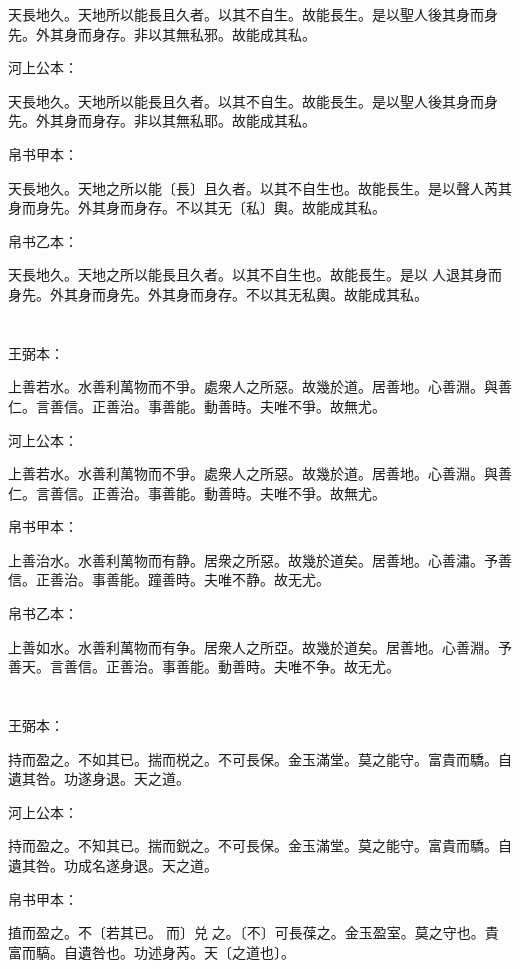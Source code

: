 \documentclass[a5paper]{ctexbook}
\begin{document}
    天長地久。天地所以能長且久者。以其不自生。故能長生。是以聖人後其身而身先。外其身而身存。非以其無私邪。故能成其私。

    河上公本：

    天長地久。天地所以能長且久者。以其不自生。故能長生。是以聖人後其身而身先。外其身而身存。非以其無私耶。故能成其私。

    帛书甲本：

    天長地久。天地之所以能〔長〕且久者。以其不自生也。故能長生。是以聲人芮其身而身先。外其身而身存。不以其无〔私〕輿。故能成其私。

    帛书乙本：

    天長地久。天地之所以能長且久者。以其不自生也。故能長生。是以𦔻人退其身而身先。外其身而身先。外其身而身存。不以其无私輿。故能成其私。

    \chapter{}
    王弼本：

    上善若水。水善利萬物而不爭。處衆人之所惡。故幾於道。居善地。心善淵。與善仁。言善信。正善治。事善能。動善時。夫唯不爭。故無尤。

    河上公本：

    上善若水。水善利萬物而不爭。處衆人之所惡。故幾於道。居善地。心善淵。與善仁。言善信。正善治。事善能。動善時。夫唯不爭。故無尤。

    帛书甲本：

    上善治水。水善利萬物而有静。居衆之所惡。故幾於道矣。居善地。心善潚。予善信。正善治。事善能。蹱善時。夫唯不静。故无尤。

    帛书乙本：

    上善如水。水善利萬物而有争。居衆人之所亞。故幾於道矣。居善地。心善淵。予善天。言善信。正善治。事善能。動善時。夫唯不争。故无尤。

    \chapter{}
    王弼本：

    持而盈之。不如其已。揣而棁之。不可長保。金玉滿堂。莫之能守。富貴而驕。自遺其咎。功遂身退。天之道。

    河上公本：

    持而盈之。不知其已。揣而鋭之。不可長保。金玉滿堂。莫之能守。富貴而驕。自遺其咎。功成名遂身退。天之道。

    帛书甲本：

    㨁而盈之。不〔若其已。𢵦而〕兑☐之。〔不〕可長葆之。金玉盈室。莫之守也。貴富而䮦。自遺咎也。功述身芮。天〔之道也〕。
\end{document}
